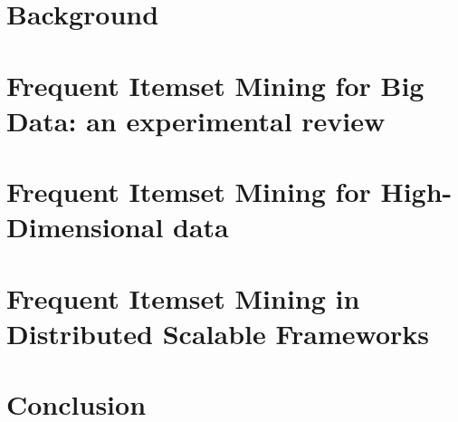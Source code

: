 \documentclass[11pt, a4paper, oneside]{Thesis} %
\begin{document}
\chapter{Background}\label{background}


\chapter{Frequent Itemset Mining for Big Data: an experimental review}\label{survey}

\chapter {Frequent Itemset Mining for High-Dimensional data}\label{pampa}

\chapter{Frequent Itemset Mining in Distributed Scalable Frameworks}\label{nemico}


\chapter{Conclusion}\label{thesis_conclusion}



\clearpage




\end{document}
